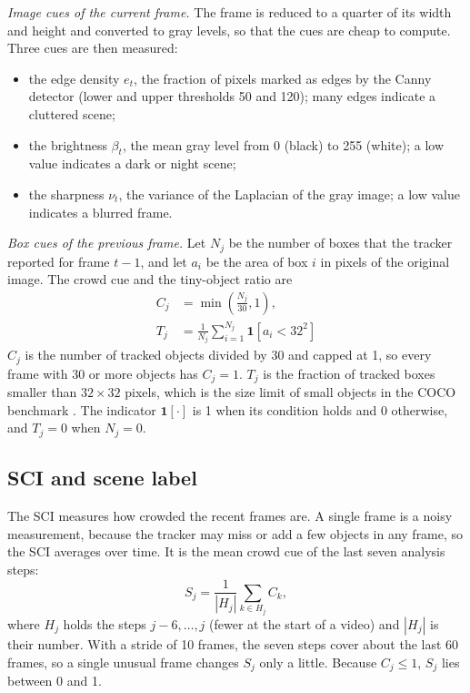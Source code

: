 \documentclass[journal]{new-aiaa}
\begin{document}
\emph{Image cues of the current frame.} The frame is reduced to a quarter of
its width and height and converted to gray levels, so that the cues are cheap
to compute. Three cues are then measured:
\begin{itemize}
\item the edge density $e_t$, the fraction of pixels marked as edges by the
      Canny detector (lower and upper thresholds 50 and 120); many edges
      indicate a cluttered scene;
\item the brightness $\beta_t$, the mean gray level from 0 (black) to 255
      (white); a low value indicates a dark or night scene;
\item the sharpness $\nu_t$, the variance of the Laplacian of the gray image;
      a low value indicates a blurred frame.
\end{itemize}

\emph{Box cues of the previous frame.} Let $N_j$ be the number of boxes that
the tracker reported for frame $t-1$, and let $a_i$ be the area of box $i$ in
pixels of the original image. The crowd cue and the tiny-object ratio are
\begin{align}
C_j&=\min\!\left(\frac{N_j}{30},1\right),\label{eq:crowd}\\
T_j&=\frac{1}{N_j}\sum_{i=1}^{N_j}\mathbf{1}\!\left[a_i<32^2\right]\label{eq:tiny}
\end{align}
$C_j$ is the number of tracked objects divided by 30 and capped at 1, so every
frame with 30 or more objects has $C_j=1$. $T_j$ is the fraction of tracked
boxes smaller than $32\times32$ pixels, which is the size limit of small
objects in the COCO benchmark \cite{lin2014coco}. The indicator
$\mathbf{1}[\cdot]$ is 1 when its condition holds and 0 otherwise, and $T_j=0$
when $N_j=0$.

\subsection{SCI and scene label}\label{sec:sci}
The SCI measures how crowded the recent frames are.
A single frame is a noisy measurement, because the tracker may miss or add a
few objects in any frame, so the SCI averages over time. It is the mean crowd
cue of the last seven analysis steps:
\begin{equation}
S_j=\frac{1}{|H_j|}\sum_{k\in H_j} C_k,
\label{eq:sci}
\end{equation}
where $H_j$ holds the steps $j-6,\dots,j$ (fewer at the start of a video) and
$|H_j|$ is their number. With a stride of 10 frames, the seven steps cover
about the last 60 frames, so a single unusual frame changes $S_j$ only a little.
Because $C_j\le1$, $S_j$ lies between 0 and 1.
\end{document}
